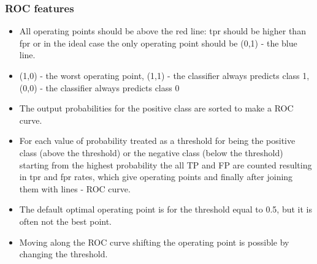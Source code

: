 \documentclass[smaller, proffesionalfonts]{beamer}
\begin{document}
\begin{frame}
\frametitle{ROC features}
\begin{block}{}
\begin{itemize}
\item 
All operating points should be above the red line: tpr should be higher than fpr or in the ideal case the only operating point should be (0,1) - the blue line.
\item 
(1,0) - the worst operating point, (1,1) - the classifier always predicts class 1, (0,0) - the classifier always predicts class 0
\item 
The output probabilities for the positive class are sorted to make a ROC curve.
\item
For each value of probability treated as a threshold for being the positive class (above the threshold) or the negative class (below the threshold) starting from the highest probability the all TP and FP are counted resulting in tpr and fpr rates, which give operating points and finally after joining them with lines - ROC curve.
\item
The default optimal operating point is for the threshold equal to 0.5, but it is often not the best point.
\item
Moving along the ROC curve shifting the operating point is possible by changing the threshold.
\end{itemize}
\end{block}
\end{frame}


\end{document}

